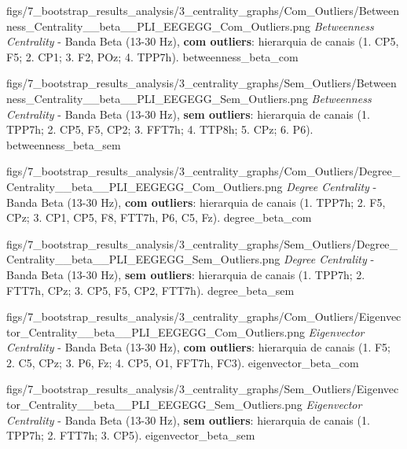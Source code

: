 \ultrawidefigure
{figs/7_bootstrap_results_analysis/3_centrality_graphs/Com_Outliers/Betweenness_Centrality__beta__PLI_EEGEGG_Com_Outliers.png}
{\textit{Betweenness Centrality} - Banda Beta (13-30 Hz), \textbf{com outliers}: hierarquia de canais (1. CP5, F5; 2. CP1; 3. F2, POz; 4. TPP7h).}
{betweenness_beta_com}

\ultrawidefigure
{figs/7_bootstrap_results_analysis/3_centrality_graphs/Sem_Outliers/Betweenness_Centrality__beta__PLI_EEGEGG_Sem_Outliers.png}
{\textit{Betweenness Centrality} - Banda Beta (13-30 Hz), \textbf{sem outliers}: hierarquia de canais (1. TPP7h; 2. CP5, F5, CP2; 3. FFT7h; 4. TTP8h; 5. CPz; 6. P6).}
{betweenness_beta_sem}


\ultrawidefigure
{figs/7_bootstrap_results_analysis/3_centrality_graphs/Com_Outliers/Degree_Centrality__beta__PLI_EEGEGG_Com_Outliers.png}
{\textit{Degree Centrality} - Banda Beta (13-30 Hz), \textbf{com outliers}: hierarquia de canais (1. TPP7h; 2. F5, CPz; 3. CP1, CP5, F8, FTT7h, P6, C5, Fz).}
{degree_beta_com}

\ultrawidefigure
{figs/7_bootstrap_results_analysis/3_centrality_graphs/Sem_Outliers/Degree_Centrality__beta__PLI_EEGEGG_Sem_Outliers.png}
{\textit{Degree Centrality} - Banda Beta (13-30 Hz), \textbf{sem outliers}: hierarquia de canais (1. TPP7h; 2. FTT7h, CPz; 3. CP5, F5, CP2, FTT7h).}
{degree_beta_sem}


\ultrawidefigure
{figs/7_bootstrap_results_analysis/3_centrality_graphs/Com_Outliers/Eigenvector_Centrality__beta__PLI_EEGEGG_Com_Outliers.png}
{\textit{Eigenvector Centrality} - Banda Beta (13-30 Hz), \textbf{com outliers}: hierarquia de canais (1. F5; 2. C5, CPz; 3. P6, Fz; 4. CP5, O1, FFT7h, FC3).}
{eigenvector_beta_com}

\ultrawidefigure
{figs/7_bootstrap_results_analysis/3_centrality_graphs/Sem_Outliers/Eigenvector_Centrality__beta__PLI_EEGEGG_Sem_Outliers.png}
{\textit{Eigenvector Centrality} - Banda Beta (13-30 Hz), \textbf{sem outliers}: hierarquia de canais (1. TPP7h; 2. FTT7h; 3. CP5).}
{eigenvector_beta_sem}

